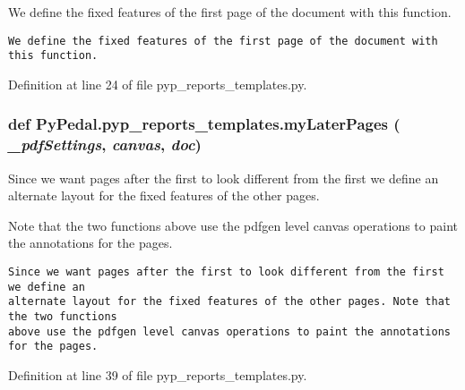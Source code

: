 We define the fixed features of the first page of the document with this function. 



\footnotesize\begin{verbatim}We define the fixed features of the first page of the document with this function.
\end{verbatim}
\normalsize
 

Definition at line 24 of file pyp\_\-reports\_\-templates.py.\hypertarget{namespacePyPedal_1_1pyp__reports__templates_87a5529fdb00426f8c8bbda1ac856bda}{
\subsubsection[myLaterPages]{\setlength{\rightskip}{0pt plus 5cm}def Py\-Pedal.pyp\_\-reports\_\-templates.my\-Later\-Pages ( {\em \_\-pdf\-Settings},  {\em canvas},  {\em doc})}}
\label{namespacePyPedal_1_1pyp__reports__templates_87a5529fdb00426f8c8bbda1ac856bda}


Since we want pages after the first to look different from the first we define an alternate layout for the fixed features of the other pages. 

Note that the two functions above use the pdfgen level canvas operations to paint the annotations for the pages.

\footnotesize\begin{verbatim}Since we want pages after the first to look different from the first we define an
alternate layout for the fixed features of the other pages. Note that the two functions
above use the pdfgen level canvas operations to paint the annotations for the pages.
\end{verbatim}
\normalsize
 

Definition at line 39 of file pyp\_\-reports\_\-templates.py.